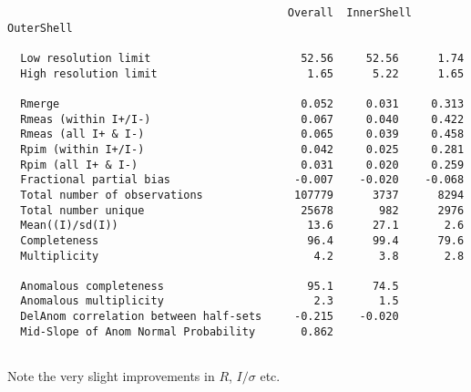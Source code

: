 \documentclass[a4paper, 11pt]{article}
\begin{document}
{\begin{verbatim}
                                           Overall  InnerShell OuterShell

  Low resolution limit                       52.56     52.56      1.74
  High resolution limit                       1.65      5.22      1.65

  Rmerge                                     0.052     0.031     0.313
  Rmeas (within I+/I-)                       0.067     0.040     0.422
  Rmeas (all I+ & I-)                        0.065     0.039     0.458
  Rpim (within I+/I-)                        0.042     0.025     0.281
  Rpim (all I+ & I-)                         0.031     0.020     0.259
  Fractional partial bias                   -0.007    -0.020    -0.068
  Total number of observations              107779      3737      8294
  Total number unique                        25678       982      2976
  Mean((I)/sd(I))                             13.6      27.1       2.6
  Completeness                                96.4      99.4      79.6
  Multiplicity                                 4.2       3.8       2.8

  Anomalous completeness                      95.1      74.5
  Anomalous multiplicity                       2.3       1.5
  DelAnom correlation between half-sets     -0.215    -0.020
  Mid-Slope of Anom Normal Probability       0.862


\end{verbatim}
}

Note the very slight improvements in $R$, $I/\sigma$ etc.
\end{document}

